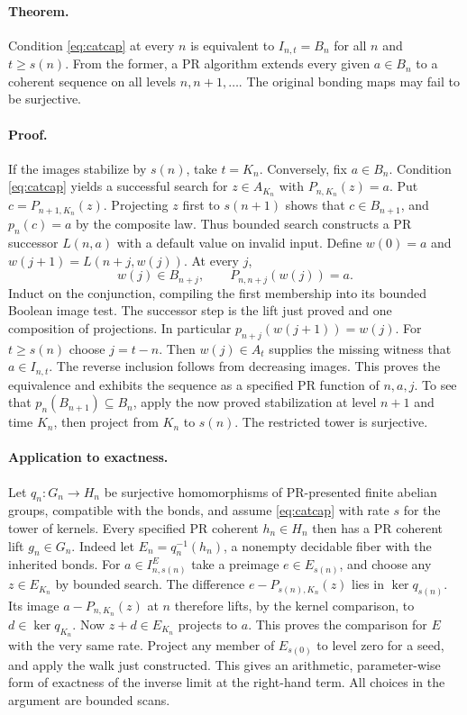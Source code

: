 \paragraph{Theorem.}
Condition \eqref{eq:catcap} at every $n$ is equivalent to
$I_{n,t}=B_n$ for all $n$ and $t\ge s(n)$.
From the former, a PR algorithm extends every given $a\in B_n$ to a
coherent sequence on all levels $n,n+1,\ldots$. The original bonding
maps may fail to be surjective.

\paragraph{Proof.}
If the images stabilize by $s(n)$, take $t=K_n$. Conversely, fix
$a\in B_n$. Condition \eqref{eq:catcap} yields a successful search
for $z\in A_{K_n}$ with $P_{n,K_n}(z)=a$. Put
$c=P_{n+1,K_n}(z)$. Projecting $z$ first to $s(n+1)$ shows that
$c\in B_{n+1}$, and $p_n(c)=a$ by the composite law.
Thus bounded search constructs a PR successor $L(n,a)$ with a
default value on invalid input. Define $w(0)=a$ and
$w(j+1)=L(n+j,w(j))$. At every $j$,
\[
     w(j)\in B_{n+j}, \qquad P_{n,n+j}(w(j))=a .
\]
Induct on the conjunction, compiling the first membership into its bounded
Boolean image test. The successor step is the lift just proved and one
composition of projections. In particular $p_{n+j}(w(j+1))=w(j)$.
For $t\ge s(n)$ choose $j=t-n$. Then $w(j)\in A_t$ supplies the missing
witness that $a\in I_{n,t}$. The reverse inclusion follows from decreasing
images. This proves the equivalence and exhibits the sequence as a
specified PR function of $n,a,j$. To see that $p_n(B_{n+1})\subseteq B_n$, apply the now proved stabilization at level $n+1$ and time $K_n$,
then project from $K_n$ to $s(n)$. The restricted tower is surjective.

\paragraph{Application to exactness.}
Let $q_n:G_n\to H_n$ be surjective homomorphisms of PR-presented
finite abelian groups, compatible with the bonds, and assume
\eqref{eq:catcap} with rate $s$ for the tower of kernels.
Every specified PR coherent $h_n\in H_n$ then has a PR coherent lift
$g_n\in G_n$. Indeed let $E_n=q_n^{-1}(h_n)$, a nonempty decidable fiber
with the inherited bonds. For $a\in I^E_{n,s(n)}$ take a preimage
$e\in E_{s(n)}$, and choose any $z\in E_{K_n}$ by bounded search.
The difference $e-P_{s(n),K_n}(z)$ lies in $\ker q_{s(n)}$.
Its image $a-P_{n,K_n}(z)$ at $n$ therefore lifts, by the kernel
comparison, to $d\in\ker q_{K_n}$. Now $z+d\in E_{K_n}$ projects to
$a$. This proves the comparison for $E$ with the very same rate.
Project any member of $E_{s(0)}$ to level zero for a seed, and apply the
walk just constructed. This gives an arithmetic, parameter-wise form of
exactness of the inverse limit at the right-hand term. All choices in
the argument are bounded scans.

